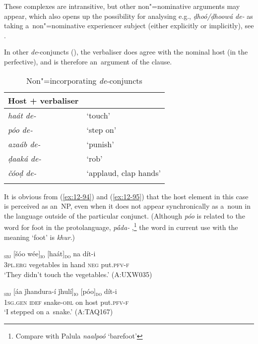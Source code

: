 These complexes are intransitive, but other non"=nominative arguments may appear, which also opens up the possibility for analysing e.g., \textit{ḍhoó/ḍhoowá de-} as taking a~non"=nominative experiencer subject (either explicitly or implicitly), see . 


 In other \textit{de}-conjuncts (), the verbaliser does agree with the nominal host (in the perfective), and is therefore an~argument of the clause. 


\begin{table}[ht]
\caption{Non"=incorporating \textit{de}-conjuncts}
\begin{tabularx}{.75\textwidth}{ l@{\hspace{45pt}} Q }
\lspbottomrule
\textbf{Host + verbaliser} &
\\\hline
\textit{haát de-} &
`touch'\\
\textit{póo de-} &
`step on'\\
\textit{azaáb de-} &
`punish'\\
\textit{ḍaaká de-} &
`rob'\\
\textit{čóoḍ de-} &
`applaud, clap hands'\\\lspbottomrule
\end{tabularx}
\label{tab:12-8}
\end{table}


It is obvious from (\ref{ex:12-94}) and (\ref{ex:12-95}) that the host element in this case is
perceived as an~NP, even when it does not appear synchronically as a~noun in the language outside of
the particular conjunct. (Although \textit{póo} is related to the word for foot in the protolanguage, \textit{p\'{\={a}}da-} \citep[8056]{turner1966},\footnote{Compare with Palula \textit{naalpoó} `barefoot'} the word in current use with the meaning `foot' is
\textit{khur}.)

\begin{exe}
\ex
\label{ex:12-94}
\gll [taním]\textsubscript{\textsc{sbj}} [šóo wée]\textsubscript{\textsc{io}} [haát]\textsubscript{\textsc{do}} na dít-i \\
\textsc{3pl.erg} vegetables in hand \textsc{neg} put.\textsc{pfv-f} \\
\glt `They didn't touch the vegetables.' (A:UXW035)
\end{exe}
\begin{exe}
\ex
\label{ex:12-95}
\gll [míi]\textsubscript{\textsc{sbj}} [áa ǰhandura-í ǰhulí]\textsubscript{\textsc{io}} [póo]\textsubscript{\textsc{do}} dít-i  \\
\textsc{1sg.gen} \textsc{idef} snake-\textsc{obl} on host put.\textsc{pfv-f} \\
\glt `I stepped on a~snake.' (A:TAQ167)
\end{exe}

